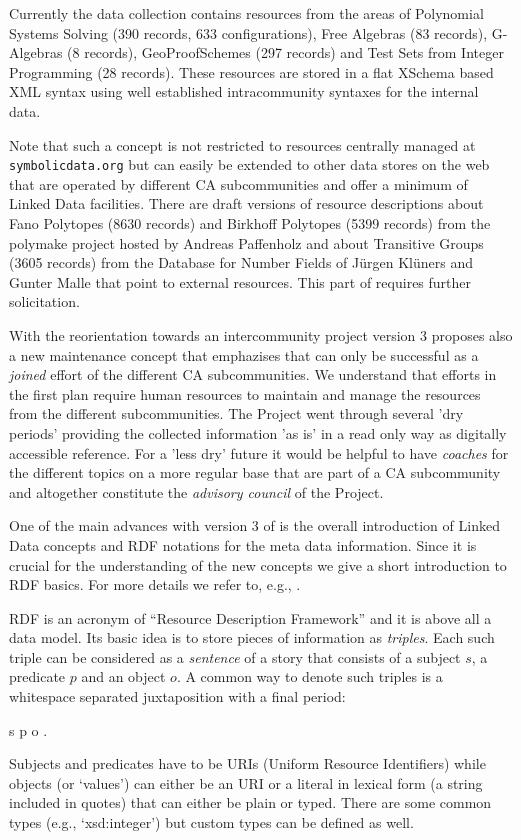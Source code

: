 \documentclass[a4paper,11pt]{article}
\begin{document}
\begin{multicols}{2}
Currently the {\SD} data collection contains resources from the areas of
Polynomial Systems Solving (390 records, 633 configurations), Free Algebras
(83 records), G-Algebras (8 records), GeoProofSchemes (297 records) and Test
Sets from Integer Programming (28 records). These resources are stored in a
flat XSchema based XML syntax using well established intracommunity syntaxes
for the internal data.

Note that such a concept is not restricted to resources centrally managed at
\texttt{symbolicdata.org} but can easily be extended to other data stores on
the web that are operated by different CA subcommunities and offer a minimum of
Linked Data facilities.  There are draft versions of resource descriptions
about Fano Polytopes (8630 records) \cite{fano} and Birkhoff Polytopes (5399
records) \cite{birkhoff} from the polymake project \cite{polymake} hosted by
Andreas Paffenholz and about Transitive Groups (3605 records) from the Database
for Number Fields \cite{galoisdb} of Jürgen Klüners and Gunter Malle that point
to external resources.  This part of {\SD} requires further solicitation.

With the reorientation towards an intercommunity project {\SD} version 3
proposes also a new maintenance concept that emphazises that {\SD} can only be
successful as a \emph{joined} effort of the different CA subcommunities.  We
understand that efforts in the first plan require human resources to maintain
and manage the resources from the different subcommunities. The {\SD} Project
went through several 'dry periods' providing the collected information 'as is'
in a read only way as digitally accessible reference. For a 'less dry' future
it would be helpful to have \emph{coaches} for the different topics on a more
regular base that are part of a CA subcommunity and altogether constitute the
\emph{advisory council} of the {\SD} Project.


One of the main advances with version 3 of {\SD} is the overall introduction of
Linked Data concepts and RDF notations for the meta data information.  Since it
is crucial for the understanding of the new concepts we give a short
introduction to RDF basics. For more details we refer to, e.g., \cite{RDF}.

RDF is an acronym of ``Resource Description Framework'' and it is above all a
data model. Its basic idea is to store pieces of information as \emph{triples}.
Each such triple can be considered as a \emph{sentence} of a story that
consists of a subject $s$, a predicate $p$ and an object $o$.  A common way to
denote such triples is a whitespace separated juxtaposition with a final
period:
\begin{center} s \; p \; o \; . \end{center}
Subjects and predicates have to be URIs (Uniform Resource Identifiers) while
objects (or `values') can either be an URI or a literal in lexical form (a
string included in quotes) that can either be plain or typed. There are some
common types (e.g., `xsd:integer') but custom types can be defined as well.


\end{multicols}
\end{document}
